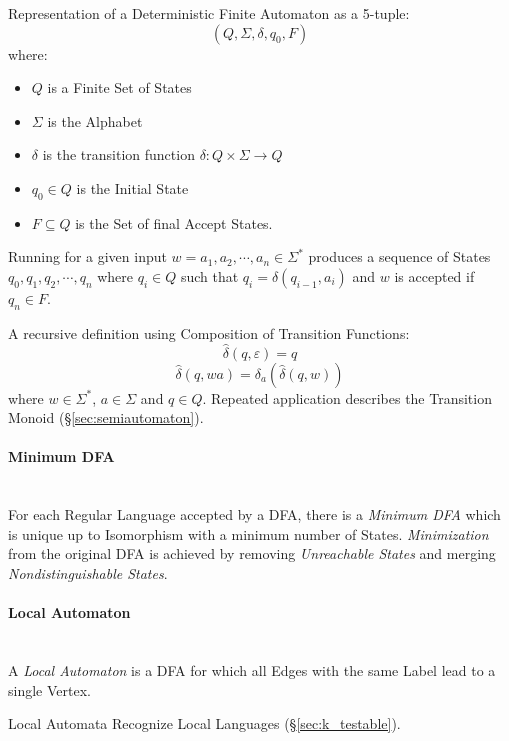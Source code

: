Representation of a Deterministic Finite Automaton as a 5-tuple:
\[
  (Q,\Sigma,\delta,q_0,F)
\]
where:
\begin{itemize}
  \item $Q$ is a Finite Set of States
  \item $\Sigma$ is the Alphabet
  \item $\delta$ is the transition function $\delta: Q \times
    \Sigma \rightarrow Q$
  \item $q_0 \in Q$ is the Initial State
  \item $F \subseteq Q$ is the Set of final Accept States.
\end{itemize}

Running for a given input $w = a_1,a_2, \cdots , a_n \in \Sigma^*$
produces a sequence of States $q_0,q_1,q_2,\cdots , q_n$ where $q_i
\in Q$ such that $q_i = \delta (q_{i-1},a_i)$ and $w$ is accepted if
$q_n \in F$.

A recursive definition using Composition of Transition Functions:
\[
  \widehat{\delta}(q,\varepsilon) = q
\]\[
  \widehat{\delta}(q,wa) = \delta_a(\widehat{\delta}(q,w))
\]
where $w \in \Sigma^*$, $a \in \Sigma$ and $q \in Q$. Repeated
application describes the Transition Monoid
(\S\ref{sec:semiautomaton}).



\paragraph{Minimum DFA}\label{sec:minimum_dfa}\hfill \\

For each Regular Language accepted by a DFA, there is a \emph{Minimum
  DFA} which is unique up to Isomorphism with a minimum number of
States. \emph{Minimization} from the original DFA is achieved by
removing \emph{Unreachable States} and merging
\emph{Nondistinguishable States}.



\paragraph{Local Automaton}\label{sec:local_automaton}\hfill \\

A \emph{Local Automaton} is a DFA for which all Edges with the same
Label lead to a single Vertex.

Local Automata Recognize Local Languages (\S\ref{sec:k_testable}).



